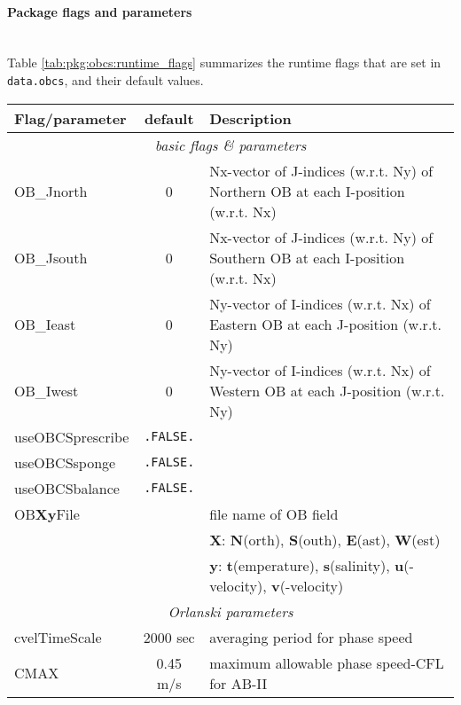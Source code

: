 \paragraph{Package flags and parameters}
~ \\
%
Table \ref{tab:pkg:obcs:runtime_flags} summarizes the
runtime flags that are set in \texttt{data.obcs}, and
their default values.

\begin{table}[!ht]
\centering
  {\footnotesize
    \begin{tabular}{|l|c|l|}
      \hline 
      \textbf{Flag/parameter} & \textbf{default} &  \textbf{Description}  \\
      \hline \hline
         \multicolumn{3}{|c|}{\textit{basic flags \& parameters} } \\
         \hline
        OB\_Jnorth & 0 & 
           Nx-vector of J-indices (w.r.t. Ny) of Northern OB
           at each I-position (w.r.t. Nx) \\
        OB\_Jsouth & 0 & 
           Nx-vector of J-indices (w.r.t. Ny) of Southern OB
           at each I-position (w.r.t. Nx) \\
        OB\_Ieast & 0 & 
           Ny-vector of I-indices (w.r.t. Nx) of Eastern OB
           at each J-position (w.r.t. Ny) \\
        OB\_Iwest & 0 & 
           Ny-vector of I-indices (w.r.t. Nx) of Western OB
           at each J-position (w.r.t. Ny) \\
        useOBCSprescribe & \texttt{.FALSE.} & 
           ~ \\
        useOBCSsponge & \texttt{.FALSE.} & 
           ~ \\
        useOBCSbalance & \texttt{.FALSE.} & 
           ~ \\
        OB\textbf{X}\textbf{y}File & ~ & 
           file name of OB field \\
        ~ & ~ & 
           \textbf{X}: \textbf{N}(orth), \textbf{S}(outh), 
                       \textbf{E}(ast), \textbf{W}(est) \\
        ~ & ~ & 
           \textbf{y}: \textbf{t}(emperature), \textbf{s}(salinity), 
           \textbf{u}(-velocity), \textbf{v}(-velocity) \\
      \hline
      \multicolumn{3}{|c|}{\textit{Orlanski parameters} } \\
      \hline
        cvelTimeScale & 2000 sec & 
           averaging period for phase speed \\
        CMAX & 0.45 m/s & 
           maximum allowable phase speed-CFL for AB-II \\

\end{tabular}}
\end{table}
